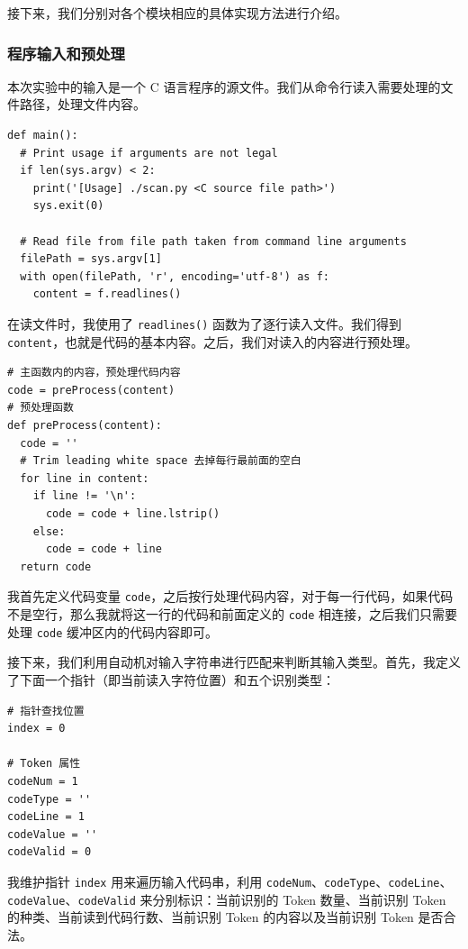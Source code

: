 \documentclass[UTF8]{ctexart}
\begin{document}
接下来，我们分别对各个模块相应的具体实现方法进行介绍。

\subsubsection{程序输入和预处理}

本次实验中的输入是一个 C 语言程序的源文件。我们从命令行读入需要处理的文件路径，处理文件内容。

\begin{verbatim}
def main():
  # Print usage if arguments are not legal
  if len(sys.argv) < 2:
    print('[Usage] ./scan.py <C source file path>')
    sys.exit(0)

  # Read file from file path taken from command line arguments
  filePath = sys.argv[1]
  with open(filePath, 'r', encoding='utf-8') as f:
    content = f.readlines()
\end{verbatim}

在读文件时，我使用了 \texttt{readlines()} 函数为了逐行读入文件。我们得到 \texttt{content}，也就是代码的基本内容。之后，我们对读入的内容进行预处理。

\begin{verbatim}
# 主函数内的内容，预处理代码内容
code = preProcess(content)
# 预处理函数
def preProcess(content):
  code = ''
  # Trim leading white space 去掉每行最前面的空白
  for line in content:
    if line != '\n':
      code = code + line.lstrip()
    else:
      code = code + line
  return code
\end{verbatim}

我首先定义代码变量 \texttt{code}，之后按行处理代码内容，对于每一行代码，如果代码不是空行，那么我就将这一行的代码和前面定义的 \texttt{code} 相连接，之后我们只需要处理 \texttt{code} 缓冲区内的代码内容即可。

接下来，我们利用自动机对输入字符串进行匹配来判断其输入类型。首先，我定义了下面一个指针（即当前读入字符位置）和五个识别类型：

\begin{verbatim}
# 指针查找位置
index = 0

# Token 属性
codeNum = 1
codeType = ''
codeLine = 1
codeValue = ''
codeValid = 0
\end{verbatim}

我维护指针 \texttt{index} 用来遍历输入代码串，利用 \texttt{codeNum}、\texttt{codeType}、\texttt{codeLine}、\\\texttt{codeValue}、\texttt{codeValid} 来分别标识：当前识别的 Token 数量、当前识别 Token 的种类、当前读到代码行数、当前识别 Token 的内容以及当前识别 Token 是否合法。
\end{document}
